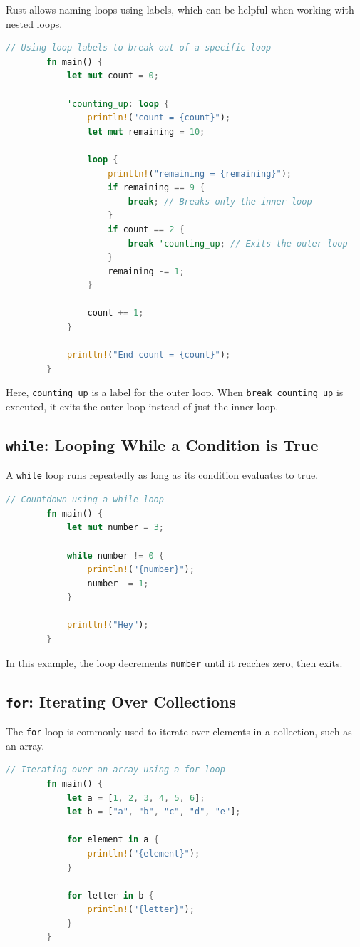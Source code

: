 \documentclass[a4paper,12pt]{report}
\begin{document}
	Rust allows naming loops using labels, which can be helpful when working with nested loops.
	
	\begin{lstlisting}[language=Rust]
		// Using loop labels to break out of a specific loop
		fn main() {
			let mut count = 0;
			
			'counting_up: loop {
				println!("count = {count}");
				let mut remaining = 10;
				
				loop {
					println!("remaining = {remaining}");
					if remaining == 9 {
						break; // Breaks only the inner loop
					}
					if count == 2 {
						break 'counting_up; // Exits the outer loop
					}
					remaining -= 1;
				}
				
				count += 1;
			}
			
			println!("End count = {count}");
		}
	\end{lstlisting}
	
		\noindent Here, \texttt{\textquotesingle counting\_up} is a label for the outer loop. When \texttt{break \textquotesingle counting\_up} is executed, it exits the outer loop instead of just the inner loop.
		
	
	\subsection*{\texttt{while}: Looping While a Condition is True}
	
	A \texttt{while} loop runs repeatedly as long as its condition evaluates to true.
	
	\begin{lstlisting}[language=Rust]
		// Countdown using a while loop
		fn main() {
			let mut number = 3;
			
			while number != 0 {
				println!("{number}");
				number -= 1;
			}
			
			println!("Hey");
		}
	\end{lstlisting}
	
	\noindent In this example, the loop decrements \texttt{number} until it reaches zero, then exits.
	
	\subsection*{\texttt{for}: Iterating Over Collections}
	
	The \texttt{for} loop is commonly used to iterate over elements in a collection, such as an array.
	
	\begin{lstlisting}[language=Rust]
		// Iterating over an array using a for loop
		fn main() {
			let a = [1, 2, 3, 4, 5, 6];
			let b = ["a", "b", "c", "d", "e"];
			
			for element in a {
				println!("{element}");
			}
			
			for letter in b {
				println!("{letter}");
			}
		}
	\end{lstlisting}
	
\end{document}
